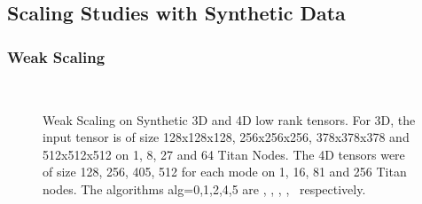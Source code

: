 \subsection{Scaling Studies with Synthetic Data}

\subsubsection{Weak Scaling}

\begin{figure}
\\
\caption {Weak Scaling on Synthetic 3D and 4D low rank tensors. For 3D, the input tensor is of size 128x128x128, 256x256x256, 378x378x378 and 512x512x512 on 1, 8, 27 and 64 Titan Nodes. The 4D tensors were of size 128, 256, 405, 512 for each mode on 1, 16, 81 and 256 Titan nodes.  The algorithms alg=0,1,2,4,5 are \MU, \HALS, \BPP, \ADMM, \Nestrov\ respectively.}
\label{fig:synweakscaling}
\end{figure}

